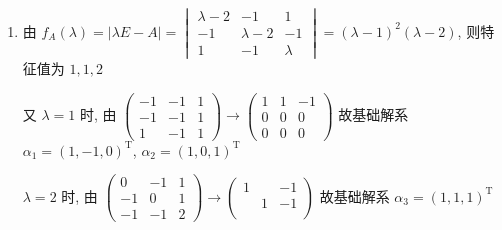      \paragraph{} %
         \begin{enumerate}
             \item %
                   由 \( f_{A}(\lambda) = |\lambda E - A| = \begin{vmatrix}
                       \lambda - 2 & -1          & 1       \\
                       -1          & \lambda - 2 & -1      \\
                       1           & -1          & \lambda
                   \end{vmatrix} = (\lambda - 1)^{2}(\lambda - 2) \), 则特征值为 \( 1, 1, 2 \)

                   又 \( \lambda = 1 \) 时, 由 \( \begin{pmatrix}
                       -1 & -1 & 1 \\
                       -1 & -1 & 1 \\
                       1  & -1 & 1
                   \end{pmatrix} \rightarrow \begin{pmatrix}
                       1 & 1 & -1 \\
                       0 & 0 & 0  \\
                       0 & 0 & 0
                   \end{pmatrix} \) 故基础解系 \( \alpha_{1} = (1, -1, 0)^{\mathrm{T}} \), \( \alpha_{2} = (1, 0, 1)^{\mathrm{T}} \)

                   \( \lambda = 2 \) 时, 由 \( \begin{pmatrix}
                       0  & -1 & 1 \\
                       -1 & 0  & 1 \\
                       -1 & -1 & 2
                   \end{pmatrix} \rightarrow \begin{pmatrix}
                       1 &   & -1 \\
                         & 1 & -1 \\
                         &   &
                   \end{pmatrix} \) 故基础解系 \( \alpha_{3} = (1, 1, 1)^{\mathrm{T}} \)


\end{enumerate}
